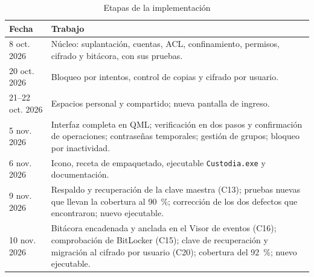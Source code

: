\documentclass[conference]{IEEEtran}
\begin{document}
\begin{table}[!htb]
\caption{Etapas de la implementación}
\label{tab:crono}
\centering
\footnotesize
\begin{tabular}{|p{1.4cm}|p{6.5cm}|}
\hline
\textbf{Fecha} & \textbf{Trabajo} \\
\hline
8 oct. 2026 & Núcleo: suplantación, cuentas, ACL, confinamiento, permisos, cifrado y bitácora, con sus pruebas. \\
\hline
20 oct. 2026 & Bloqueo por intentos, control de copias y cifrado por usuario. \\
\hline
21--22 oct. 2026 & Espacios personal y compartido; nueva pantalla de ingreso. \\
\hline
5 nov. 2026 & Interfaz completa en QML; verificación en dos pasos y confirmación de operaciones; contraseñas temporales; gestión de grupos; bloqueo por inactividad. \\
\hline
6 nov. 2026 & Icono, receta de empaquetado, ejecutable \texttt{Custodia.exe} y documentación. \\
\hline
9 nov. 2026 & Respaldo y recuperación de la clave maestra (C13); pruebas nuevas que llevan la cobertura al 90~\%; corrección de los dos defectos que encontraron; nuevo ejecutable. \\
\hline
10 nov. 2026 & Bitácora encadenada y anclada en el Visor de eventos (C16); comprobación de BitLocker (C15); clave de recuperación y migración al cifrado por usuario (C20); cobertura del 92~\%; nuevo ejecutable. \\
\hline
\end{tabular}
\end{table}
\end{document}
